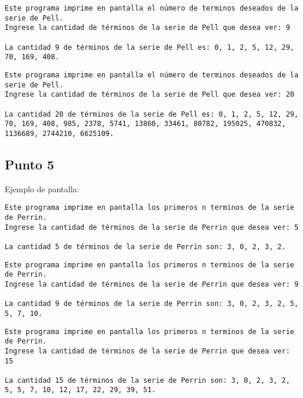 \begin{lstlisting}
Este programa imprime en pantalla el número de terminos deseados de la serie de Pell.
Ingrese la cantidad de términos de la serie de Pell que desea ver: 9

La cantidad 9 de términos de la serie de Pell es: 0, 1, 2, 5, 12, 29, 70, 169, 408.
\end{lstlisting}

\begin{lstlisting}
Este programa imprime en pantalla el número de terminos deseados de la serie de Pell.
Ingrese la cantidad de términos de la serie de Pell que desea ver: 20

La cantidad 20 de términos de la serie de Pell es: 0, 1, 2, 5, 12, 29, 70, 169, 408, 985, 2378, 5741, 13860, 33461, 80782, 195025, 470832, 1136689, 2744210, 6625109.
\end{lstlisting}





\subsection{Punto 5}
	
	Ejemplo de pantalla:
\begin{lstlisting}
Este programa imprime en pantalla los primeros n terminos de la serie de Perrin.
Ingrese la cantidad de términos de la serie de Perrin que desea ver: 5

La cantidad 5 de términos de la serie de Perrin son: 3, 0, 2, 3, 2.
\end{lstlisting}

\begin{lstlisting}
Este programa imprime en pantalla los primeros n terminos de la serie de Perrin.
Ingrese la cantidad de términos de la serie de Perrin que desea ver: 9

La cantidad 9 de términos de la serie de Perrin son: 3, 0, 2, 3, 2, 5, 5, 7, 10.
\end{lstlisting}

\begin{lstlisting}
Este programa imprime en pantalla los primeros n terminos de la serie de Perrin.
Ingrese la cantidad de términos de la serie de Perrin que desea ver: 15

La cantidad 15 de términos de la serie de Perrin son: 3, 0, 2, 3, 2, 5, 5, 7, 10, 12, 17, 22, 29, 39, 51.
\end{lstlisting}

